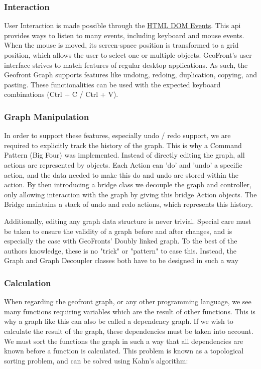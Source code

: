 \subsubsection{ Interaction }
User Interaction is made possible through the \href{https://developer.mozilla.org/en-US/docs/web/api/event}{HTML DOM Events}. 
This api provides ways to listen to many events, including keyboard and mouse events. 
When the mouse is moved, its screen-space position is transformed to a grid position, which allows the user to select one or multiple objects. 
GeoFront's user interface strives to match features of regular desktop applications. As such, the Geofront Graph supports features like undoing, redoing, duplication, copying, and pasting. These functionalities can be used with the expected keyboard combinations (Ctrl + C / Ctrl + V).

\subsubsection*{ Graph Manipulation }
In order to support these features, especially undo / redo support, we are required to explicitly track the history of the graph. 
This is why a Command Pattern (Big Four) was implemented.
Instead of directly editing the graph, all actions are represented by  objects. 
Each Action can 'do' and 'undo' a specific action, and the data needed to make this do and undo are stored within the action. 
By then introducing a bridge class we decouple the graph and controller, only allowing interaction with the graph by giving this bridge Action objects. The Bridge maintains a stack of undo and redo actions, which represents this history.  

Additionally, editing any graph data structure is never trivial. 
Special care must be taken to ensure the validity of a graph before and after changes, and is especially the case with GeoFronts' Doubly linked graph. 
To the best of the authors knowledge, these is no "trick" or "pattern" to ease this. Instead, the Graph and Graph Decoupler classes both have to be designed in such a way 

\subsubsection*{Calculation}
When regarding the geofront graph, or any other programming language, we see many functions requiring variables which are the result of other functions. 
This is why a graph like this can also be called a dependency graph. 
If we wish to calculate the result of the graph, these dependencies must be taken into account. We must sort the functions the graph in such a way that all dependencies are known before a function is calculated.
This problem is known as a topological sorting problem, and can be solved using Kahn's algorithm: 

